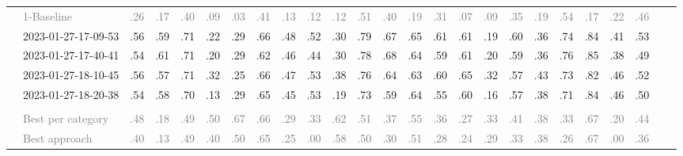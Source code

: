 \begin{table*}
\begin{tabular}{@{}ll@{\hspace{10pt}}c@{\hspace{5pt}}cccccccccccccccccccccc@{}}
& \textcolor{gray}{1-Baseline} & \textcolor{gray}{.26} & \textcolor{gray}{.17} & \textcolor{gray}{.40} & \textcolor{gray}{.09} & \textcolor{gray}{.03} & \textcolor{gray}{.41} & \textcolor{gray}{.13} & \textcolor{gray}{.12} & \textcolor{gray}{.12} & \textcolor{gray}{.51} & \textcolor{gray}{.40} & \textcolor{gray}{.19} & \textcolor{gray}{.31} & \textcolor{gray}{.07} & \textcolor{gray}{.09} & \textcolor{gray}{.35} & \textcolor{gray}{.19} & \textcolor{gray}{.54} & \textcolor{gray}{.17} & \textcolor{gray}{.22} & \textcolor{gray}{.46} \\
& 2023-01-27-17-09-53 & .56 & .59 & .71 & .22 & .29 & .66 & .48 & .52 & .30 & .79 & .67 & .65 & .61 & .61 & .19 & .60 & .36 & .74 & .84 & .41 & .53 \\
& 2023-01-27-17-40-41 & .54 & .61 & .71 & .20 & .29 & .62 & .46 & .44 & .30 & .78 & .68 & .64 & .59 & .61 & .20 & .59 & .36 & .76 & .85 & .38 & .49 \\
& 2023-01-27-18-10-45 & .56 & .57 & .71 & .32 & .25 & .66 & .47 & .53 & .38 & .76 & .64 & .63 & .60 & .65 & .32 & .57 & .43 & .73 & .82 & .46 & .52 \\
& 2023-01-27-18-20-38 & .54 & .58 & .70 & .13 & .29 & .65 & .45 & .53 & .19 & .73 & .59 & .64 & .55 & .60 & .16 & .57 & .38 & .71 & .84 & .46 & .50 \\
\addlinespace
\multicolumn{2}{@{}l}{\emph{Nahj al-Balagha}} \\
& \textcolor{gray}{Best per category} & \textcolor{gray}{.48} & \textcolor{gray}{.18} & \textcolor{gray}{.49} & \textcolor{gray}{.50} & \textcolor{gray}{.67} & \textcolor{gray}{.66} & \textcolor{gray}{.29} & \textcolor{gray}{.33} & \textcolor{gray}{.62} & \textcolor{gray}{.51} & \textcolor{gray}{.37} & \textcolor{gray}{.55} & \textcolor{gray}{.36} & \textcolor{gray}{.27} & \textcolor{gray}{.33} & \textcolor{gray}{.41} & \textcolor{gray}{.38} & \textcolor{gray}{.33} & \textcolor{gray}{.67} & \textcolor{gray}{.20} & \textcolor{gray}{.44} \\
& \textcolor{gray}{Best approach} & \textcolor{gray}{.40} & \textcolor{gray}{.13} & \textcolor{gray}{.49} & \textcolor{gray}{.40} & \textcolor{gray}{.50} & \textcolor{gray}{.65} & \textcolor{gray}{.25} & \textcolor{gray}{.00} & \textcolor{gray}{.58} & \textcolor{gray}{.50} & \textcolor{gray}{.30} & \textcolor{gray}{.51} & \textcolor{gray}{.28} & \textcolor{gray}{.24} & \textcolor{gray}{.29} & \textcolor{gray}{.33} & \textcolor{gray}{.38} & \textcolor{gray}{.26} & \textcolor{gray}{.67} & \textcolor{gray}{.00} & \textcolor{gray}{.36} \\

\end{tabular}
\end{table*}
